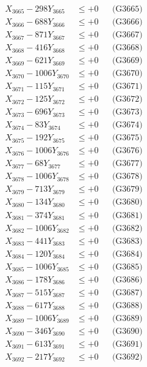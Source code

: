 \documentclass[a4paper,10pt]{article}
\begin{document}
{\begin{align}
X_{3665} - 298Y_{3665} &\leq +0 && \text{(G3665)} \\
X_{3666} - 688Y_{3666} &\leq +0 && \text{(G3666)} \\
X_{3667} - 871Y_{3667} &\leq +0 && \text{(G3667)} \\
X_{3668} - 416Y_{3668} &\leq +0 && \text{(G3668)} \\
X_{3669} - 621Y_{3669} &\leq +0 && \text{(G3669)} \\
X_{3670} - 1006Y_{3670} &\leq +0 && \text{(G3670)} \\
\allowbreak
X_{3671} - 115Y_{3671} &\leq +0 && \text{(G3671)} \\
X_{3672} - 125Y_{3672} &\leq +0 && \text{(G3672)} \\
X_{3673} - 696Y_{3673} &\leq +0 && \text{(G3673)} \\
X_{3674} - 83Y_{3674} &\leq +0 && \text{(G3674)} \\
X_{3675} - 192Y_{3675} &\leq +0 && \text{(G3675)} \\
X_{3676} - 1006Y_{3676} &\leq +0 && \text{(G3676)} \\
X_{3677} - 68Y_{3677} &\leq +0 && \text{(G3677)} \\
X_{3678} - 1006Y_{3678} &\leq +0 && \text{(G3678)} \\
X_{3679} - 713Y_{3679} &\leq +0 && \text{(G3679)} \\
X_{3680} - 134Y_{3680} &\leq +0 && \text{(G3680)} \\
\allowbreak
X_{3681} - 374Y_{3681} &\leq +0 && \text{(G3681)} \\
X_{3682} - 1006Y_{3682} &\leq +0 && \text{(G3682)} \\
X_{3683} - 441Y_{3683} &\leq +0 && \text{(G3683)} \\
X_{3684} - 120Y_{3684} &\leq +0 && \text{(G3684)} \\
X_{3685} - 1006Y_{3685} &\leq +0 && \text{(G3685)} \\
X_{3686} - 178Y_{3686} &\leq +0 && \text{(G3686)} \\
X_{3687} - 515Y_{3687} &\leq +0 && \text{(G3687)} \\
X_{3688} - 617Y_{3688} &\leq +0 && \text{(G3688)} \\
X_{3689} - 1006Y_{3689} &\leq +0 && \text{(G3689)} \\
X_{3690} - 346Y_{3690} &\leq +0 && \text{(G3690)} \\
\allowbreak
X_{3691} - 613Y_{3691} &\leq +0 && \text{(G3691)} \\
X_{3692} - 217Y_{3692} &\leq +0 && \text{(G3692)} \\

\end{align}}
\end{document}
